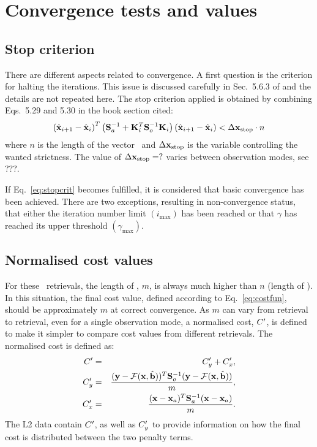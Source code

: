 \section{Convergence tests and values}
\label{sec:conv}
%
\subsection{Stop criterion}
There are different aspects related to convergence. A first question is the
criterion for halting the iterations. This issue is discussed carefully in
Sec.~5.6.3 of \citet{rodgers:00} and the details are not repeated here. The
stop criterion applied is obtained by combining Eqs.~5.29 and 5.30 in the
book section cited:
\begin{equation}
  \label{eq:stopcrit}
  \left( \hat{\mathbf{x}}_{i+1} - \hat{\mathbf{x}}_i \right)^T
  \left( \mathbf{S}_{a}^{-1} + 
         \mathbf{K}_{i}^T\mathbf{S}_{o}^{-1}\mathbf{K}_{i} \right)
  \left( \hat{\mathbf{x}}_{i+1} - \hat{\mathbf{x}}_i \right) < \Delta\mathbf{x}_\mathrm{stop} \cdot n
\end{equation}
where $n$ is the length of the vector \SttVct\ and
$\Delta\mathbf{x}_\mathrm{stop}$ is the variable controlling the wanted
strictness. The value of $\Delta\mathbf{x}_\mathrm{stop}=?$ varies between
observation modes, see ???.

If Eq.~\ref{eq:stopcrit} becomes fulfilled, it is considered that basic
convergence has been achieved. There are two exceptions, resulting in
non-convergence status, that either the iteration number limit
$(i_\mathrm{max})$ has been reached or that $\gamma$ has reached its upper
threshold $(\gamma_\mathrm{max})$.


\subsection{Normalised cost values}
%
For these \smr\ retrievals, the length of \MsrVct, $m$, is always much higher
than $n$ (length of \SttVct). In this situation, the final cost value, defined
according to Eq.~\ref{eq:costfun}, should be approximately $m$ at correct
convergence. As $m$ can vary from retrieval to retrieval, even for a single
observation mode, a normalised cost, $C'$, is defined to make it simpler to
compare cost values from different retrievals. The normalised cost is
defined as:
\begin{eqnarray}
  \label{eq:scaledc}
  C' &=& C_y' + C_x', \\
  C_y' &=& \frac{(\mathbf{y}-\mathcal{F}(\mathbf{x},\hat{\mathbf{b}}))^T\mathbf{S}_{o}^{-1}
  (\mathbf{y}-\mathcal{F}(\mathbf{x},\hat{\mathbf{b}}))}{m},\\
  C_x' &=& \frac{(\mathbf{x}-\mathbf{x}_{a})^T\mathbf{S}_{a}^{-1}(\mathbf{x}-\mathbf{x}_{a})}{m}.\\
\end{eqnarray}
The L2 data contain $C'$, as well as $C_y'$ to provide information
on how the final cost is distributed between the two penalty terms.


